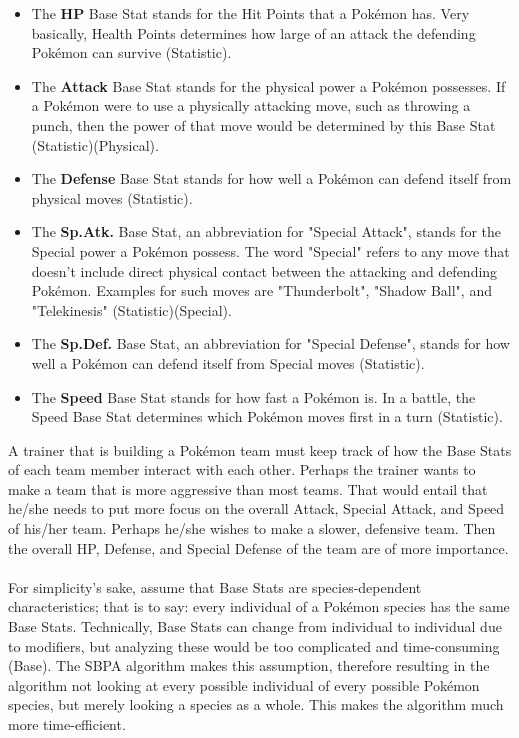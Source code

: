 \documentclass{article}
\begin{document}
\begin{itemize}
	\item The \textbf{HP} Base Stat stands for the Hit Points that a Pok\'emon has. Very basically, Health Points determines how large of an attack the defending Pok\'emon can survive (Statistic).
	\item The \textbf{Attack} Base Stat stands for the physical power a Pok\'emon possesses. If a Pok\'emon were to use a physically attacking move, such as throwing a punch, then the power of that move would be determined by this Base Stat (Statistic)(Physical). 
	\item The \textbf{Defense} Base Stat stands for how well a Pok\'emon can defend itself from physical moves (Statistic). 
	\item The \textbf{Sp.Atk.} Base Stat, an abbreviation for "Special Attack", stands for the Special power a Pok\'emon possess. The word "Special" refers to any move that doesn't include direct physical contact between the attacking and defending Pok\'emon. Examples for such moves are "Thunderbolt", "Shadow Ball", and "Telekinesis" (Statistic)(Special).
	\item The \textbf{Sp.Def.} Base Stat, an abbreviation for "Special Defense", stands for how well a Pok\'emon can defend itself from Special moves (Statistic).
	\item The \textbf{Speed} Base Stat stands for how fast a Pok\'emon is. In a battle, the Speed Base Stat determines which Pok\'emon moves first in a turn (Statistic).
\end{itemize}
A trainer that is building a Pok\'emon team must keep track of how the Base Stats of each team member interact with each other. Perhaps the trainer wants to make a team that is more aggressive than most teams. That would entail that he/she needs to put more focus on the overall Attack, Special Attack, and Speed of his/her team. Perhaps he/she wishes to make a slower, defensive team. Then the overall HP, Defense, and Special Defense of the team are of more importance.\\\\
For simplicity's sake, assume that Base Stats are species-dependent characteristics; that is to say: every individual of a Pok\'emon species has the same Base Stats. Technically, Base Stats can change from individual to individual due to modifiers, but analyzing these would be too complicated and time-consuming (Base). The SBPA algorithm makes this assumption, therefore resulting in the algorithm not looking at every possible individual of every possible Pok\'emon species, but merely looking a species as a whole. This makes the algorithm much more time-efficient.
\end{document}
